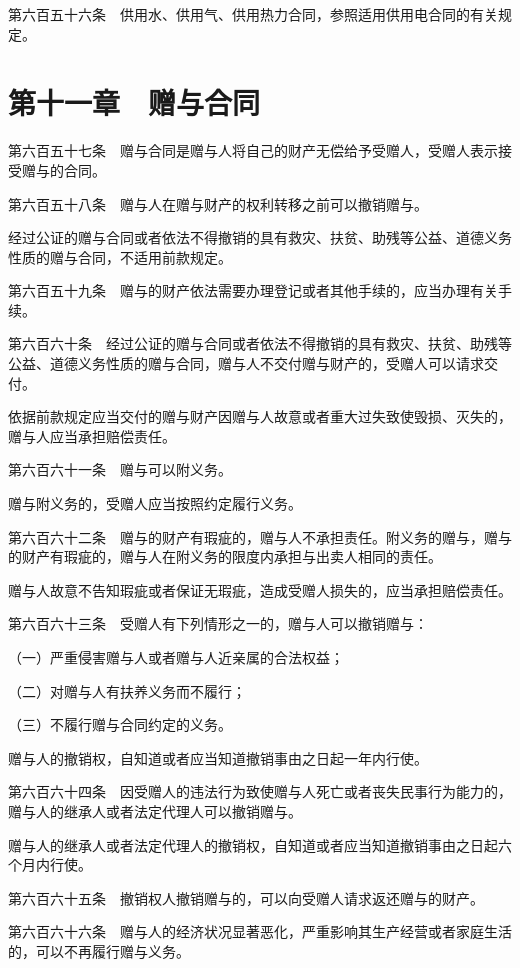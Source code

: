 \documentclass[UTF8,12pt,a4paper]{ctexbook}
\begin{document}
第六百五十六条　供用水、供用气、供用热力合同，参照适用供用电合同的有关规定。

\section*{第十一章　赠与合同}

第六百五十七条　赠与合同是赠与人将自己的财产无偿给予受赠人，受赠人表示接受赠与的合同。

第六百五十八条　赠与人在赠与财产的权利转移之前可以撤销赠与。

经过公证的赠与合同或者依法不得撤销的具有救灾、扶贫、助残等公益、道德义务性质的赠与合同，不适用前款规定。

第六百五十九条　赠与的财产依法需要办理登记或者其他手续的，应当办理有关手续。

第六百六十条　经过公证的赠与合同或者依法不得撤销的具有救灾、扶贫、助残等公益、道德义务性质的赠与合同，赠与人不交付赠与财产的，受赠人可以请求交付。

依据前款规定应当交付的赠与财产因赠与人故意或者重大过失致使毁损、灭失的，赠与人应当承担赔偿责任。

第六百六十一条　赠与可以附义务。

赠与附义务的，受赠人应当按照约定履行义务。

第六百六十二条　赠与的财产有瑕疵的，赠与人不承担责任。附义务的赠与，赠与的财产有瑕疵的，赠与人在附义务的限度内承担与出卖人相同的责任。

赠与人故意不告知瑕疵或者保证无瑕疵，造成受赠人损失的，应当承担赔偿责任。

第六百六十三条　受赠人有下列情形之一的，赠与人可以撤销赠与：

（一）严重侵害赠与人或者赠与人近亲属的合法权益；

（二）对赠与人有扶养义务而不履行；

（三）不履行赠与合同约定的义务。

赠与人的撤销权，自知道或者应当知道撤销事由之日起一年内行使。

第六百六十四条　因受赠人的违法行为致使赠与人死亡或者丧失民事行为能力的，赠与人的继承人或者法定代理人可以撤销赠与。

赠与人的继承人或者法定代理人的撤销权，自知道或者应当知道撤销事由之日起六个月内行使。

第六百六十五条　撤销权人撤销赠与的，可以向受赠人请求返还赠与的财产。

第六百六十六条　赠与人的经济状况显著恶化，严重影响其生产经营或者家庭生活的，可以不再履行赠与义务。
\end{document}
